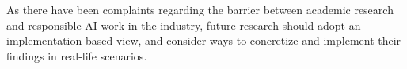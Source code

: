 




As there have been complaints regarding the barrier between academic research and responsible AI work in the industry, future research should adopt an implementation-based view, and consider ways to concretize and implement their findings in real-life scenarios.